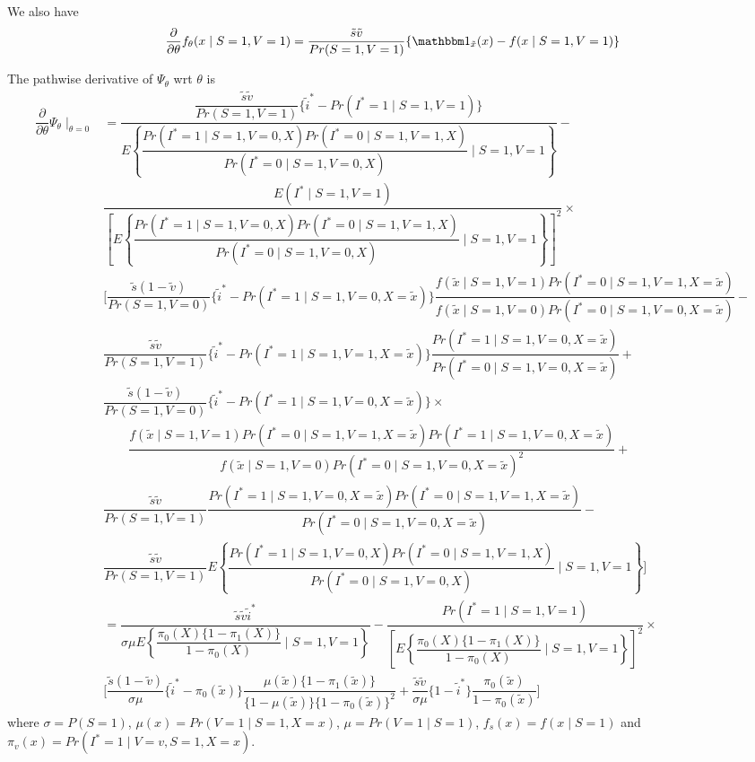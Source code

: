 \documentclass{article}
\begin{document}
We also have
$$\dfrac{\partial}{\partial\theta}f_\theta(x\mid S=1, V=1) = \dfrac{\tilde s \tilde v}{Pr(S=1, V=1)}\{\mathbbm 1_{\tilde x}(x)-f(x\mid S=1, V=1)\}$$

The pathwise derivative of $\Psi_\theta$ wrt $\theta$ is
\begin{align*}
    \dfrac{\partial}{\partial\theta}\Psi_\theta\mid_{\theta=0} &= \dfrac{\dfrac{\tilde s\tilde v}{Pr(S=1, V=1)}\{\tilde i^* - Pr(I^*=1\mid S=1, V=1)\}}{E\left\{\dfrac{Pr(I^*=1\mid S=1, V=0, X)Pr(I^*=0\mid S=1, V=1, X)}{Pr(I^*=0\mid S=1, V=0, X)}\mid S=1, V=1\right\}} -\\
    & \dfrac{E(I^*\mid S=1, V=1)}{\left[E\left\{\dfrac{Pr(I^*=1\mid S=1, V=0, X)Pr(I^*=0\mid S=1, V=1, X)}{Pr(I^*=0\mid S=1, V=0, X)}\mid S=1, V=1\right\}\right]^2}\times \\
    &\bigg[ \dfrac{\tilde s(1 - \tilde v)}{Pr(S=1, V=0)}\{\tilde i^* - Pr(I^* = 1\mid S=1, V=0, X=\tilde x)\}\dfrac{f(\tilde x\mid S=1, V=1)Pr(I^*=0\mid S=1, V=1, X=\tilde x)}{f(\tilde x\mid S=1, V=0)Pr(I^*=0\mid S=1, V=0, X=\tilde x)} -\\
    & \dfrac{\tilde s\tilde v}{Pr(S=1, V=1)}\{\tilde i^* - Pr(I^*=1\mid S=1, V=1, X=\tilde x)\}\dfrac{Pr(I^*=1\mid S=1, V=0, X=\tilde x)}{Pr(I^*=0\mid S=1, V=0, X=\tilde x)} + \\
    &\dfrac{\tilde s(1 - \tilde v)}{Pr(S=1, V=0)}\{\tilde i^* - Pr(I^* = 1\mid S=1, V=0, X=\tilde x)\}\times \\&\qquad \dfrac{f(\tilde x\mid S=1, V=1)Pr(I^*=0\mid S=1, V=1, X=\tilde x)Pr(I^*=1\mid S=1, V=0, X=\tilde x)}{f(\tilde x\mid S=1, V=0)Pr(I^*=0\mid S=1, V=0, X=\tilde x)^2}+\\
    &\dfrac{\tilde s\tilde v}{Pr(S=1, V=1)}\dfrac{Pr(I^*=1\mid S=1, V=0, X=\tilde x)Pr(I^*=0\mid S=1, V=1, X=\tilde x)}{Pr(I^*=0\mid S=1, V=0, X=\tilde x)} -\\
   & \dfrac{\tilde s\tilde v}{Pr(S=1, V=1)}E\left\{\dfrac{Pr(I^*=1\mid S=1, V=0, X)Pr(I^*=0\mid S=1, V=1, X)}{Pr(I^*=0\mid S=1, V=0, X)}\mid S=1, V=1\right\}\bigg]\\
   &= \dfrac{\tilde s\tilde v\tilde i^*}{\sigma\mu E\left\{\dfrac{\pi_0(X)\{1 - \pi_1(X)\}}{1 - \pi_0(X)}\mid S=1, V=1\right\}} - \dfrac{Pr(I^*=1\mid S=1, V=1)}{\left[E\left\{\dfrac{\pi_0(X)\{1 - \pi_1(X)\}}{1 - \pi_0(X)}\mid S=1, V=1\right\}\right]^2}\times \\
    &\bigg[ \dfrac{\tilde s(1 - \tilde v)}{\sigma\mu}\{\tilde i^* - \pi_0(\tilde x)\}\dfrac{\mu(\tilde x)\{1 - \pi_1(\tilde x)\}}{\{1 - \mu(\tilde x)\}\{1 - \pi_0(\tilde x)\}^2} + \dfrac{\tilde s\tilde v}{\sigma\mu}\{1-\tilde i^*\}\dfrac{\pi_0(\tilde x)}{1-\pi_0(\tilde x)}\bigg]
\end{align*}
where $\sigma=P(S=1)$, $\mu(x) = Pr(V=1\mid S=1, X=x)$, $\mu=Pr(V=1\mid S=1)$, $f_s(x)=f(x\mid S=1)$ and $\pi_v(x)=Pr(I^*=1\mid V=v, S=1, X=x)$.
\end{document}
